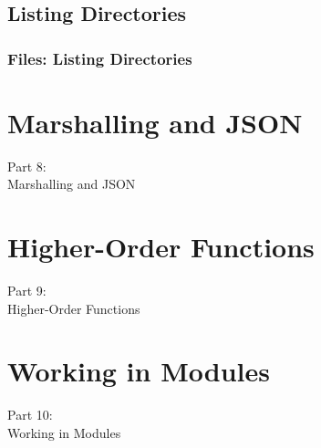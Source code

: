 \subsection{Listing Directories}
\contentListdir{
\begin{verbatim}

\end{verbatim}
}
\begin{frame}
    \frametitle{\textbf{Files:} Listing Directories}
    \vspace{0mm}
    \contentListdir
\end{frame}


\section{Marshalling and JSON}
\begin{frame}
    \vspace{25mm}
    \begin{center}
        \Huge{Part 8:\\Marshalling and JSON}
    \end{center}
\end{frame}


\section{Higher-Order Functions}
\begin{frame}
    \vspace{25mm}
    \begin{center}
        \Huge{Part 9:\\Higher-Order Functions}
    \end{center}
\end{frame}


\section{Working in Modules}
\begin{frame}
    \vspace{25mm}
    \begin{center}
        \Huge{Part 10:\\Working in Modules}
    \end{center}
\end{frame}

